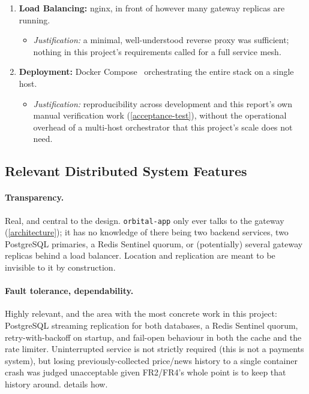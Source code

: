 \documentclass{scrartcl}
\begin{document}
\begin{enumerate}
  \item \textbf{Load Balancing:} nginx, in front of however many gateway replicas are running.
  \begin{itemize}
    \item \emph{Justification:} a minimal, well-understood reverse proxy was sufficient; nothing
    in this project's requirements called for a full service mesh.
  \end{itemize}

  \item \textbf{Deployment:} Docker Compose~\citep{docker2024compose} orchestrating the entire
  stack on a single host.
  \begin{itemize}
    \item \emph{Justification:} reproducibility across development and this report's own manual
    verification work (\cref{acceptance-test}), without the operational overhead of a
    multi-host orchestrator that this project's scale does not need.
  \end{itemize}
\end{enumerate}

\subsection{Relevant Distributed System Features}\label{ds-features}

\paragraph{Transparency.} Real, and central to the design. \texttt{orbital-app} only ever talks
to the gateway (\cref{architecture}); it has no knowledge of there being two backend services,
two PostgreSQL primaries, a Redis Sentinel quorum, or (potentially) several gateway replicas
behind a load balancer. Location and replication are meant to be invisible to it by construction.

\paragraph{Fault tolerance, dependability.} Highly relevant, and the area with the most concrete
work in this project: PostgreSQL streaming replication for both databases, a Redis Sentinel
quorum, retry-with-backoff on startup, and fail-open behaviour in both the cache and the rate
limiter. Uninterrupted service is not strictly required (this is not a payments system), but
losing previously-collected price/news history to a single container crash was judged
unacceptable given FR2/FR4's whole point is to keep that history around. 
details how.
\end{document}
